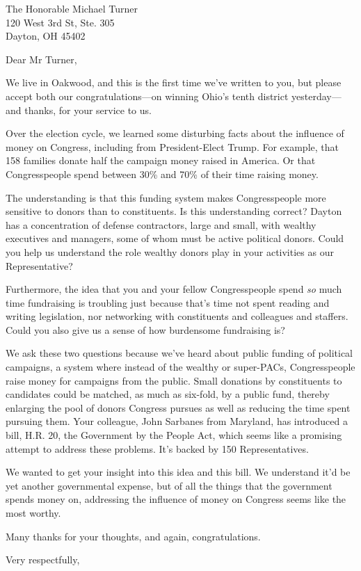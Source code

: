 \documentclass{letter}
\begin{document}
\begin{letter}{
  The Honorable Michael Turner \\
  120 West 3rd St, Ste. 305 \\
  Dayton, OH 45402}

\opening{Dear Mr Turner,}

We live in Oakwood, and this is the first time we've written to you, but please
accept both our congratulations---on winning Ohio's tenth district
yesterday---and thanks, for your service to us.

Over the election cycle, we learned some disturbing facts about the influence
of money on Congress, including from President-Elect Trump. For example, that
158 families donate half the campaign money raised in America. Or that
Congresspeople spend between 30\% and 70\% of their time raising money.

The understanding is that this funding system makes Congresspeople more
sensitive to donors than to constituents. Is this understanding correct? Dayton
has a concentration of defense contractors, large and small, with wealthy
executives and managers, some of whom must be active political donors. Could you
help us understand the role wealthy donors play in your activities as our
Representative?

Furthermore, the idea that you and your fellow Congresspeople spend {\em so}
much time fundraising is troubling just because that's time not spent reading
and writing legislation, nor networking with constituents and colleagues and
staffers. Could you also give us a sense of how burdensome fundraising is?

We ask these two questions because we've heard about public funding of political
campaigns, a system where instead of the wealthy or super-PACs, Congresspeople
raise money for campaigns from the public. Small donations by constituents to
candidates could be matched, as much as six-fold, by a public fund, thereby
enlarging the pool of donors Congress pursues as well as reducing the time spent
pursuing them. Your colleague, John Sarbanes from Maryland, has introduced a
bill, H.R. 20, the Government by the People Act, which seems like a promising
attempt to address these problems. It's backed by 150 Representatives.

We wanted to get your insight into this idea and this bill. We understand it'd
be yet another governmental expense, but of all the things that the government
spends money on, addressing the influence of money on Congress seems like the
most worthy.

Many thanks for your thoughts, and again, congratulations.

\closing{Very respectfully,}


\end{letter}
\end{document}
